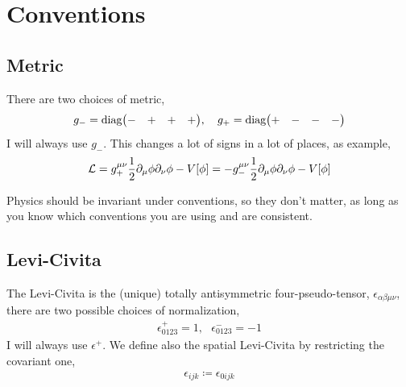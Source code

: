 \section{Conventions}

\subsection{Metric}

There are two choices of metric, 
\begin{align}
    g_-=\textnormal{diag}\mqty(-&+&+&+),\ \ \ g_+=\textnormal{diag}\mqty(+&-&-&-)
\end{align}
I will always use $g_-$. This changes a lot of signs in a lot of places, as example,
\begin{align}
    \mathcal L = g_+^{\mu\nu}\frac12\partial_\mu \phi\partial_\nu\phi-V\qty[\phi]= -g_-^{\mu\nu}\frac12\partial_\mu \phi\partial_\nu\phi-V\qty[\phi]
\end{align}

Physics should be invariant under conventions, so they don't matter, as long as you know which conventions 
you are using and are consistent.

\subsection{Levi-Civita}

The Levi-Civita is the (unique) totally antisymmetric four-pseudo-tensor, $\epsilon_{\alpha\beta\mu\nu}$, there are two possible 
choices of normalization,
\begin{align}
    \epsilon^+_{0123}=1,\ \ \ \epsilon^-_{0123}=-1
\end{align}
I will always use $\epsilon^+$. We define also the spatial Levi-Civita by restricting the covariant one,
\begin{align}
    \epsilon_{ijk} \coloneq \epsilon_{0ijk}
\end{align}